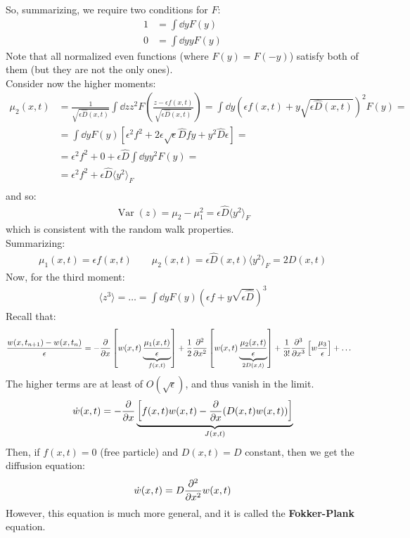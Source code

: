 \documentclass[../template.tex]{subfiles}
\begin{document}
So, summarizing, we require two conditions for $F$:
\begin{align*}
    1 &= \int \dd{y} F(y)\\
    0 &= \int \dd{y} y F(y)
\end{align*} 
Note that all normalized even functions (where $F(y) = F(-y)$) satisfy both of them (but they are not the only ones).\\
Consider now the higher moments:
\begin{align*}
    \mu_2 (x,t) &= \frac{1}{\sqrt{\epsilon \hat{D}(x,t)}} \int \dd{z} z^2 F\left(\frac{z- \epsilon f(x,t)}{\sqrt{\epsilon \hat{D}(x,t)}} \right) = \int \dd{y} (\epsilon f(x,t) + y \sqrt{\epsilon \hat{D}(x,t)})^2 F(y) = \\
    &= \int \dd{y} F(y) \left[ \epsilon^2 f^2 + 2 \epsilon \sqrt{\epsilon} \hat{D} f y + y^2 \hat{D} \epsilon \right] =\\
    &= \epsilon ^2 f^2  + 0 + \epsilon \hat{D} \int \dd{y} y^2 F(y) =\\
    &= \epsilon^2 f^2 + \epsilon \hat{D} \langle y^2 \rangle_F  \\
\end{align*}  
and so:
\begin{align*}
    \operatorname{Var}(z) = \mu_2 - \mu_1^2 = \epsilon \hat{D} \langle y^2 \rangle_F 
\end{align*}
which is consistent with the random walk properties.\\
Summarizing:
\begin{align*}
    \mu_1(x,t)
 = \epsilon f(x,t) \qquad \mu_2(x,t) = \epsilon \hat{D} (x,t) \langle y^2 \rangle_F = 2D(x,t)
\end{align*}
Now, for the third moment:
\begin{align*}
    \langle z^3 \rangle = \dots = \int \dd{y} F(y) (\epsilon f + y \sqrt{\epsilon \hat{D}} )^3 
\end{align*}
Recall that:
\begin{align*}
    \frac{w(x,t_{n+1}) - w(x,t_n)}{\epsilon} &= -\pdv{x} \left[w(x,t) \underbrace{\frac{\mu_1(x,t)}{\epsilon}}_{f(x,t)}  \right] + \frac{1}{2} \pdv[2]{x} \left[w(x,t) \underbrace{\frac{\mu_2(x,t)}{\epsilon}}_{2D(x,t)}  \right]  + \frac{1}{3!} \pdv[3]{x} \left[w \frac{\mu_3}{\epsilon} \right] + \dots
\end{align*}
The higher terms are at least of $O(\sqrt{\epsilon})$, and thus vanish in the limit. 
\begin{align*}
    \dot{w}(x,t) = -\pdv{x} \underbrace{\left[f(x,t) w(x,t) - \pdv{x}(D(x,t) w(x,t))\right]}_{J(x,t)} 
\end{align*}
Then, if $f(x,t) = 0$ (free particle) and $D(x,t) = D$ constant, then we get the diffusion equation:
\begin{align*}
\dot{w}(x,t) = D\pdv[2]{x} w(x,t) 
\end{align*}
However, this equation is much more general, and it is called the \textbf{Fokker-Plank}  equation.  
\end{document}
